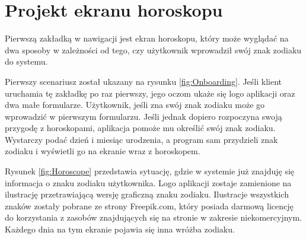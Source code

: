 \section{Projekt ekranu horoskopu}
Pierwszą zakładką w nawigacji jest ekran horoskopu, który może wyglądać na dwa sposoby w zależności od tego, czy użytkownik wprowadził swój znak zodiaku do systemu.

Pierwszy scenariusz został ukazany na rysunku \ref{fig:Onboarding}. Jeśli klient uruchamia tę zakładkę po raz pierwszy, jego oczom ukaże się logo aplikacji oraz dwa małe formularze. Użytkownik, jeśli zna swój znak zodiaku może go wprowadzić w pierwszym formularzu. Jeśli jednak dopiero rozpoczyna swoją przygodę z horoskopami, aplikacja pomoże mu określić swój znak zodiaku. Wystarczy podać dzień i miesiąc urodzenia, a program sam przydzieli znak zodiaku i wyświetli go na ekranie wraz z horoskopem.

Rysunek \ref{fig:Horoscope} przedstawia sytuację, gdzie w systemie już znajduję się informacja o znaku zodiaku użytkownika. Logo aplikacji zostaje zamienione na ilustrację przetrawiającą wersję graficzną znaku zodiaku. Ilustracje wszystkich znaków zostały pobrane ze strony Freepik.com, który posiada darmową licencję do korzystania z zasobów znajdujących się na stronie w zakresie niekomercyjnym. Każdego dnia na tym ekranie pojawia się inna wróżba zodiaku.

